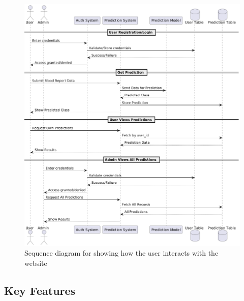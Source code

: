 \begin{figure}[htbp]
  \begin{center}
    \includegraphics[width=\textwidth]{figures/sequence-diagram.png}
  \end{center}
  \caption{Sequence diagram for showing how the user interacts with the website}\label{fig:sequence-diagram}
\end{figure}

\subsection{Key Features}

